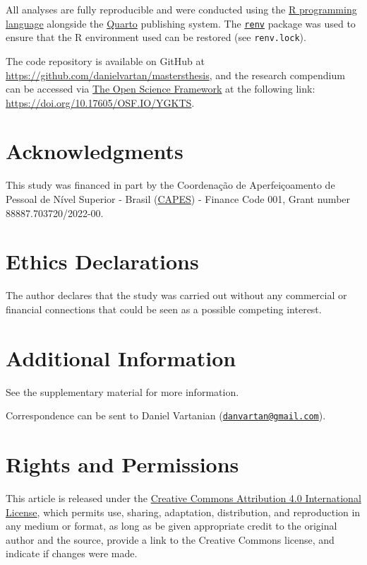 \documentclass[
12pt,
openright,
oneside,
a4paper,
chapter=TITLE,
section=TITLE,
french,
spanish,
brazil,
english
]{abntex2}
\begin{document}
All analyses are fully reproducible and were conducted using the
\href{https://www.r-project.org/}{R programming language} alongside the
\href{https://quarto.org/}{Quarto} publishing system. The
\href{https://rstudio.github.io/renv/}{\texttt{renv}} package was used
to ensure that the R environment used can be restored (see
\texttt{renv.lock}).

The code repository is available on GitHub at
\url{https://github.com/danielvartan/mastersthesis}, and the research
compendium can be accessed via \href{https://osf.io/}{The Open Science
Framework} at the following link:
\url{https://doi.org/10.17605/OSF.IO/YGKTS}.

\section{Acknowledgments}\label{acknowledgments}

This study was financed in part by the Coordenação de Aperfeiçoamento de
Pessoal de Nível Superior - Brasil
(\href{https://www.gov.br/capes/}{CAPES}) - Finance Code 001, Grant
number 88887.703720/2022-00.

\section{Ethics Declarations}\label{ethics-declarations}

The author declares that the study was carried out without any
commercial or financial connections that could be seen as a possible
competing interest.

\section{Additional Information}\label{additional-information}

See the supplementary material for more information.

Correspondence can be sent to Daniel Vartanian
(\href{mailto:danvartan@gmail.com}{\nolinkurl{danvartan@gmail.com}}).

\section{Rights and Permissions}\label{rights-and-permissions}

This article is released under the
\href{http://creativecommons.org/licenses/by/4.0/}{Creative Commons
Attribution 4.0 International License}, which permits use, sharing,
adaptation, distribution, and reproduction in any medium or format, as
long as be given appropriate credit to the original author and the
source, provide a link to the Creative Commons license, and indicate if
changes were made.
\end{document}
